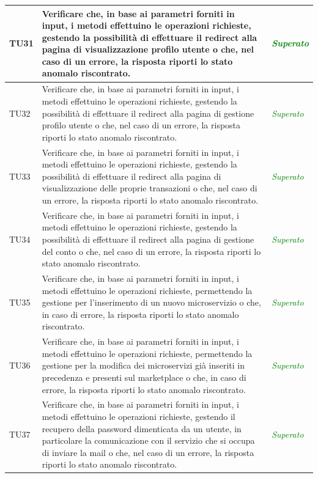 \begin{longtable}{|>{\centering\arraybackslash}p{1.5cm}|>{\centering\arraybackslash}p{8cm} | >{\centering\arraybackslash}p{3.8cm}|}
		\hypertarget{TU31}{TU31} & Verificare che, in base ai parametri forniti in input, i metodi effettuino le operazioni richieste, gestendo la possibilità di effettuare il redirect alla pagina di visualizzazione profilo utente o che, nel caso di un errore, la risposta riporti lo stato anomalo riscontrato. & \textcolor{Green}{\textit{Superato}}\\ \hline
		\hypertarget{TU32}{TU32} & Verificare che, in base ai parametri forniti in input, i metodi effettuino le operazioni richieste, gestendo la possibilità di effettuare il redirect alla pagina di gestione profilo utente o che, nel caso di un errore, la risposta riporti lo stato anomalo riscontrato. & \textcolor{Green}{\textit{Superato}}\\ \hline
		\hypertarget{TU33}{TU33} & Verificare che, in base ai parametri forniti in input, i metodi effettuino le operazioni richieste, gestendo la possibilità di effettuare il redirect alla pagina di visualizzazione delle proprie transazioni o che, nel caso di un errore, la risposta riporti lo stato anomalo riscontrato. & \textcolor{Green}{\textit{Superato}}\\ \hline
		\hypertarget{TU34}{TU34} & Verificare che, in base ai parametri forniti in input, i metodi effettuino le operazioni richieste, gestendo la possibilità di effettuare il redirect alla pagina di gestione del conto o che, nel caso di un errore, la risposta riporti lo stato anomalo riscontrato. & \textcolor{Green}{\textit{Superato}}\\ \hline
		\hypertarget{TU35}{TU35} & Verificare che, in base ai parametri forniti in input, i metodi effettuino le operazioni richieste, permettendo la gestione per l'inserimento di un nuovo microservizio o che, in caso di errore, la risposta riporti lo stato anomalo riscontrato. & \textcolor{Green}{\textit{Superato}}\\ \hline
		\hypertarget{TU36}{TU36} & Verificare che, in base ai parametri forniti in input, i metodi effettuino le operazioni richieste, permettendo la gestione per la modifica dei microservizi già inseriti in precedenza e presenti sul marketplace o che, in caso di errore, la risposta riporti lo stato anomalo riscontrato. & \textcolor{Green}{\textit{Superato}}\\ \hline
		\hypertarget{TU37}{TU37} & Verificare che, in base ai parametri forniti in input, i metodi effettuino le operazioni richieste, gestendo il recupero della password dimenticata da un utente, in particolare la comunicazione con il servizio che si occupa di inviare la mail o che, nel caso di un errore, la risposta riporti lo stato anomalo riscontrato. & \textcolor{Green}{\textit{Superato}}\\ \hline

\end{longtable}
